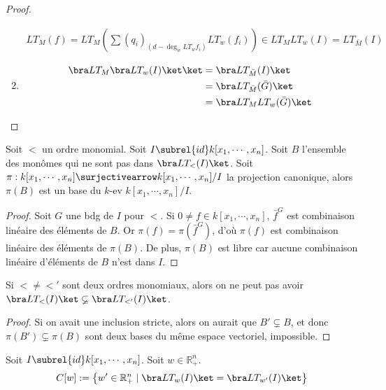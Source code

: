 \begin{proof}
\begin{enumerate}
\begin{align*}
                    LT_M(f) = LT_M \left( \sum (q_i)_{(d - \deg_w LT_w f_i)} LT_w(f_i) \right) \in LT_M LT_w(I) = LT_{\bar M}(I)
                \end{align*}
                \item
                \begin{align*}
                    \bra LT_M \bra LT_w(I) \ket \ket &= \bra LT_{\bar M}(I) \ket \\
                    &= \bra LT_{\bar M}(\bar G) \ket \\
                    &= \bra LT_M LT_w(\bar G) \ket
                \end{align*}
            \end{enumerate}
        \end{proof}
        \begin{prop}
            Soit $<$ un ordre monomial. Soit $I \subrel{id} k[x_1, \cdots, x_n]$. Soit $B$ l'ensemble des monômes qui ne sont pas dans $\bra LT_<(I) \ket$. Soit $\pi : k[x_1, \cdots, x_n] \surjectivearrow k[x_1, \cdots, x_n]/I$ la projection canonique, alors $\pi(B)$ est un base du $k$-ev $k[x_1, \cdots, x_n]/I$.
        \end{prop}
        \begin{proof}
            Soit $G$ une bdg de $I$ pour $<$. Si $0 \neq f \in k[x_1, \cdots, x_n]$, $\bar f^G$ est combinaison linéaire des éléments de $B$. Or $\pi(f) = \pi(\bar f^G)$, d'où $\pi(f)$ est combinaison linéaire des éléments de $\pi(B)$. De plus, $\pi(B)$ est libre car aucune combinaison linéaire d'éléments de $B$ n'est dans $I$.
        \end{proof}
        \begin{coro}
            Si $< \neq <'$ sont deux ordres monomiaux, alors on ne peut pas avoir $\bra LT_<(I) \ket \varsubsetneq \bra LT_{<'}(I) \ket$.
        \end{coro}
        \begin{proof}
            Si on avait une inclusion stricte, alors on aurait que $B' \varsubsetneq B$, et donc $\pi(B') \varsubsetneq \pi(B)$ sont deux bases du même espace vectoriel, impossible.
        \end{proof}
        \begin{defi}
            Soit $I \subrel{id} k[x_1, \cdots, x_n]$. Soit $w \in \mathbb{R}_+^n$.
            \begin{align*}
                C[w] := \left\{ w' \in \mathbb{R}_+^n \mid \bra LT_w(I) \ket = \bra LT_{w'}(I) \ket \right\}
            \end{align*}
        \end{defi}
